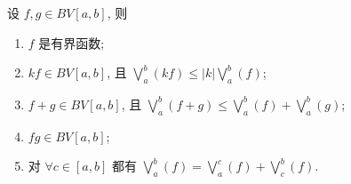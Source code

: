 \documentclass[../../main.tex]{subfiles}%
\begin{document}
\begin{proposition}[有界变差函数的性质]\label{proposition:有界变差函数的性质}
设 $f,g\in BV[a,b]$, 则
\begin{enumerate}[(1)]
\item\label{proposition:有界变差函数的性质-1} $f$ 是有界函数;

\item\label{proposition:有界变差函数的性质-2} $kf\in BV[a,b]$, 且 $\bigvee_a^b(kf)\leqslant|k|\bigvee_a^b(f)$;

\item\label{proposition:有界变差函数的性质-3} $f+g\in BV[a,b]$, 且 $\bigvee_a^b(f+g)\leqslant\bigvee_a^b(f)+\bigvee_a^b(g)$;

\item\label{proposition:有界变差函数的性质-4} $fg\in BV[a,b]$;

\item\label{proposition:有界变差函数的性质-5} 对 $\forall c\in[a,b]$ 都有 $\bigvee_a^b(f)=\bigvee_a^c(f)+\bigvee_c^b(f)$.
\end{enumerate}
\end{proposition}
\end{document}
